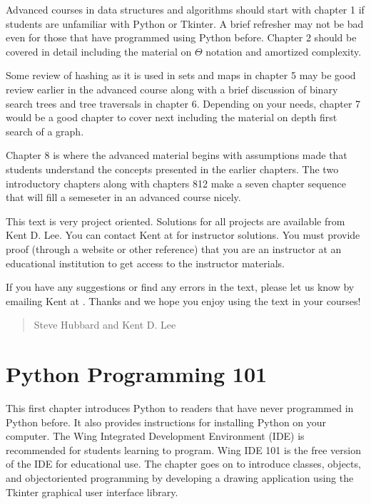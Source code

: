 \documentclass[letterpaper,10pt,english]{sphinxmanual}
\begin{document}
Advanced courses in data structures and algorithms should start with chapter 1 if students are unfamiliar with Python or Tkinter. A brief refresher may not be bad even for those that have programmed using Python before. Chapter 2 should be covered in detail including the material on \(\Theta\) notation and amortized complexity.

Some review of hashing as it is used in sets and maps in chapter 5 may be good review earlier in the advanced course along with a brief discussion of binary search trees and tree traversals in chapter 6. Depending on your needs, chapter 7 would be a good chapter to cover next including the material on depth first search of a graph.

Chapter 8 is where the advanced material begins with assumptions made that students understand the concepts presented in the earlier chapters. The two introductory chapters along with chapters 8\sphinxhyphen{}12 make a seven chapter sequence that will fill a semeseter in an advanced course nicely.

This text is very project oriented. Solutions for all projects are available from Kent D. Lee. You can contact Kent at  for instructor solutions. You must provide proof (through a website or other reference) that you are an instructor at an educational institution to get access to the instructor materials.

If you have any suggestions or find any errors in the text, please let us know by emailing Kent at . Thanks and we hope you enjoy using the text in your courses!
\begin{quote}

\textendash{}  Steve Hubbard and Kent D. Lee
\end{quote}




\chapter{Python Programming 101}
\label{\detokenize{chap1/chap1:python-programming-101}}\label{\detokenize{chap1/chap1::doc}}
This first chapter introduces Python to readers that have never programmed in Python before. It also provides instructions for installing Python on your computer. The Wing Integrated Development Environment (IDE) is recommended for students learning to program. Wing IDE 101 is the free version of the IDE for educational use. The chapter goes on to introduce classes, objects, and object\sphinxhyphen{}oriented programming by developing a drawing application using the Tkinter graphical user interface library.
\end{document}
